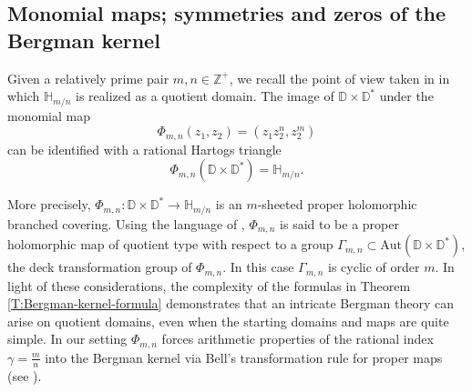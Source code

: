 \documentclass[letterpaper,11pt,reqno]{amsart}
\theoremstyle{plain}
\theoremstyle{definition}
\theoremstyle{remark}
\theoremstyle{remark}
\numberwithin{equation}{section}
\newcommand{\D}{{\mathbb D}}
\newcommand{\h}{{\mathbb H}}
\newcommand{\Z}{{\mathbb Z}}
\begin{document}




\subsection{Monomial maps; symmetries and zeros of the Bergman kernel}\label{SS:Monomial-maps}

Given a relatively prime pair $m,n \in \Z^+$, we recall the point of view taken in \cite{Edh16,bcem,CKMM20,Almugh23} in which $\h_{m/n}$ is realized as a quotient domain.
The image of $\D \times \D^*$ under the monomial map 
\begin{equation*}
\Phi_{m,n}(z_1,z_2) = (z_1 z_2^n,z_2^m)
\end{equation*}
can be identified with a rational Hartogs triangle
\begin{equation*}
\Phi_{m,n}(\D \times \D^*) = \h_{m/n}.
\end{equation*}

More precisely, $\Phi_{m,n}: \D \times \D^* \to \h_{m/n}$ is an $m$-sheeted proper holomorphic branched covering.
Using the language of \cite{bcem,ChakEdh24}, $\Phi_{m,n}$ is said to be a proper holomorphic map of quotient type with respect to a group $\Gamma_{m,n} \subset \mathrm{Aut}(\D \times \D^*)$, the deck transformation group of $\Phi_{m,n}$.
In this case $\Gamma_{m,n}$ is cyclic of order $m$.
In light of these considerations, the complexity of the formulas in Theorem \ref{T:Bergman-kernel-formula} demonstrates that an intricate Bergman theory can arise on quotient domains, even when the starting domains and maps are quite simple.
In our setting $\Phi_{m,n}$ forces arithmetic properties of the rational index $\gamma = \frac{m}{n}$ into the Bergman kernel via Bell's transformation rule for proper maps (see \cite{belltransactions}).
\end{document}
